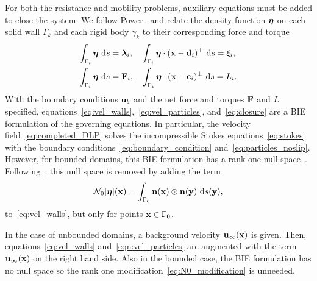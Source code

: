 \documentclass[preprint, 10pt]{elsarticle}
\begin{document}
For both the resistance and mobility problems, auxiliary equations must
be added to close the system.  We follow Power~\cite{Power1993} and
relate the density function ${\boldsymbol\eta}$ on each solid wall $\Gamma_k$ and
each rigid body $\gamma_k$ to their corresponding force and torque
\begin{equation}
  \label{eq:closure}
  \begin{aligned}
    \int_{\Gamma_i} {\boldsymbol\eta}~\text{d}s &= {\boldsymbol\lambda}_i, \quad
    \int_{\Gamma_i} {\boldsymbol\eta}\cdot ({\mathbf{x}} - {\mathbf{d}}_i)^\perp~\text{d}s = \xi_i, \\
    \int_{\Gamma_i} {\boldsymbol\eta}~\text{d}s &= {\mathbf{F}}_i, \quad
    \int_{\Gamma_i} {\boldsymbol\eta}\cdot ({\mathbf{x}} - {\mathbf{c}}_i)^\perp~\text{d}s = L_i.
  \end{aligned}
\end{equation}
With the boundary conditions ${\mathbf{u}}_b$ and the net force and torques ${\mathbf{F}}$
and $L$ specified,
equations~\eqref{eq:vel_walls},~\eqref{eq:vel_particles},
and~\eqref{eq:closure} are a BIE formulation of the governing equations.
In particular, the velocity field~\eqref{eq:completed_DLP} solves the
incompressible Stokes equations~\eqref{eq:stokes} with the boundary
conditions~\eqref{eq:boundary_condition}
and~\eqref{eq:particles_noslip}.  However, for bounded domains, this BIE
formulation has a rank one null space~\cite{Ladyzhenskaya1963}.
Following~\cite{Power1993}, this null space is removed by adding the
term
\begin{align}
  \label{eq:N0_modification}
  \mathcal{N}_0[{\boldsymbol\eta}]({\mathbf{x}}) = \int_{\Gamma_0}
  {\mathbf{n}}({\mathbf{x}})\otimes{\mathbf{n}}({\mathbf{y}})~\text{d}s(\mathbf{y}),
\end{align}
to~\eqref{eq:vel_walls}, but only for points ${\mathbf{x}} \in \Gamma_0$.

In the case of unbounded domains, a background velocity
${\mathbf{u}}_\infty({\mathbf{x}})$ is given.  Then, equations~\eqref{eq:vel_walls}
and~\eqref{eqn:vel_particles} are augmented with the term
${\mathbf{u}}_\infty({\mathbf{x}})$ on the right hand side.  Also in the bounded case, the
BIE formulation has no null space so the rank one
modification~\eqref{eq:N0_modification} is unneeded.
\end{document}
